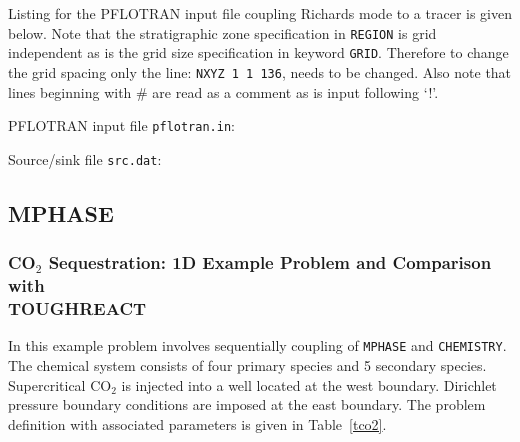 Listing for the PFLOTRAN input file coupling Richards mode to a tracer is given below. Note that the stratigraphic zone specification in {\tt REGION} is grid independent as is the grid size specification in keyword {\tt GRID}. Therefore to change the grid spacing only the line: {\tt NXYZ 1 1 136}, needs to be changed. Also note that lines beginning with \# are read as a comment as is input following `!'.

\bigskip

\noindent PFLOTRAN input file {\tt pflotran.in}: 
\scriptsize



\normalsize
\noindent
Source/sink file {\tt src.dat}:
\scriptsize
{}
\normalsize

\subsection{MPHASE}

\subsubsection{CO$_2$ Sequestration: 1D Example Problem and Comparison with\\ TOUGHREACT}

In this example problem involves sequentially coupling of {\tt MPHASE} and {\tt CHEMISTRY}. The chemical system consists of four primary species and 5 secondary species. Supercritical CO$_2$ is injected into a well located at the west boundary. Dirichlet pressure boundary conditions are imposed at the east boundary. The problem definition with associated parameters is given in Table~\ref{tco2}.

